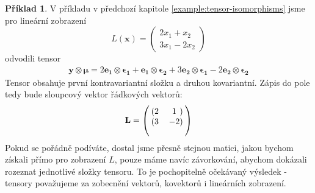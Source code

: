 \documentclass[a5paper,12pt]{amsbook}
\theoremstyle{definition}
\newtheorem{example}{Příklad}[chapter]
\newcommand{\myvec}[1]{\bm{#1}}
\newcommand{\mymatrix}[1]{\mathbf{#1}}
\begin{document}
\begin{example}

V příkladu v předchozí kapitole \ref{example:tensor-isomorphisms} jsme pro lineární zobrazení 
\begin{equation*}
L(\myvec{x}) = \left(
\begin{array}{c}
2 x_1 + x_2 \\
3x_1 - 2 x_2
\end{array}
\right)
\end{equation*}
odvodili tensor
\begin{equation*}
\begin{split}
\myvec{y}\otimes\myvec{\mu} 
= 2\myvec{e_1}\otimes\myvec{\epsilon_1}
+ \myvec{e_1}\otimes\myvec{\epsilon_2}
+ 3\myvec{e_2}\otimes\myvec{\epsilon_1}
- 2\myvec{e_2}\otimes\myvec{\epsilon_2}
\end{split}
\end{equation*}
Tensor obsahuje první kontravariantní složku a druhou kovariantní. Zápis do pole tedy bude sloupcový
vektor řádkových vektorů:
\begin{equation*}
\begin{split}
\mymatrix{L} =
\left(\begin{blockarray}{cc}
  \begin{block}{(cc)}
    2 & 1 \\
  \end{block}
  \begin{block}{(cc)}
    3 & -2 \\
  \end{block}
\end{blockarray}
\right)
\end{split}
\end{equation*}
Pokud se pořádně podíváte, dostal jsme přesně stejnou matici, jakou bychom získali přímo pro zobrazení
$L$, pouze máme navíc závorkování, abychom dokázali rozeznat jednotlivé složky tensoru. To je pochopitelně
očekávaný výsledek - tensory považujeme za zobecnění vektorů, kovektorů i lineárních zobrazení.


\end{example}
\end{document}

